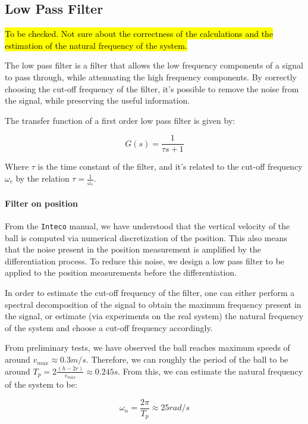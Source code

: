 \subsection{Low Pass Filter}
\label{sec:low_pass_filter}

\hl{To be checked. Not sure about the correctness of the calculations and the estimation of the natural frequency of the system.}

The low pass filter is a filter that allows the low frequency components of a signal to pass through, while attenuating the high frequency components.
By correctly choosing the cut-off frequency of the filter, it's possible to remove the noise from the signal, while preserving the useful information.

The transfer function of a first order low pass filter is given by:

\begin{equation}
    G(s) = \frac{1}{\tau s + 1}
\end{equation}

Where $\tau$ is the time constant of the filter, and it's related to the cut-off frequency $\omega_c$ by the relation $\tau = \frac{1}{\omega_c}$.

\paragraph{Filter on position}

From the \texttt{Inteco} manual, we have understood that the vertical velocity of the ball is computed via numerical discretization of the position.
This also means that the noise present in the position measurement is amplified by the differentiation process.
To reduce this noise, we design a low pass filter to be applied to the position measurements before the differentiation.

In order to estimate the cut-off frequency of the filter, one can either perform a spectral decomposition of the signal to obtain the maximum frequency present in the signal, or estimate (via experiments on the real system) the natural frequency of the system and choose a cut-off frequency accordingly.

From preliminary tests, we have observed the ball reaches maximum speeds of around $v_{max} \approx 0.3 m/s$.
Therefore, we can roughly the period of the ball to be around $T_p = 2 \frac{(h-2r)}{v_{max}} \approx 0.245s$.
From this, we can estimate the natural frequency of the system to be:

\begin{equation}
    \omega_n = \frac{2\pi}{T_p} \approx 25 rad/s
\end{equation}

